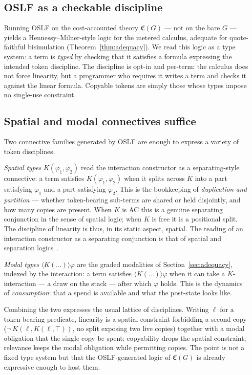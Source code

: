 \documentclass[11pt]{article}
\theoremstyle{definition}
\theoremstyle{plain}
\newcommand{\dia}[1]{\langle #1 \rangle}  %
\newcommand{\Cost}{\mathfrak{C}}              %
\begin{document}
\subsection{OSLF as a checkable discipline}

Running OSLF on the cost-accounted theory $\Cost(G)$ --- not on the bare
$G$ --- yields a Hennessy--Milner-style logic for the metered calculus,
adequate for quote-faithful bisimulation (Theorem~\ref{thm:adequacy}).
We read this logic as a type system: a term is \emph{typed} by checking
that it satisfies a formula expressing the intended token discipline. The
discipline is opt-in and per-term: the calculus does not force linearity,
but a programmer who requires it writes a term and checks it against the
linear formula. Copyable tokens are simply those whose types impose no
single-use constraint.

\subsection{Spatial and modal connectives suffice}

Two connective families generated by OSLF are enough to express a variety
of token disciplines.

\emph{Spatial types} $K(\varphi_1, \varphi_2)$ read the interaction
constructor as a separating-style connective: a term satisfies
$K(\varphi_1,\varphi_2)$ when it splits across $K$ into a part satisfying
$\varphi_1$ and a part satisfying $\varphi_2$. This is the bookkeeping of
\emph{duplication and partition} --- whether token-bearing sub-terms are
shared or held disjointly, and how many copies are present. When $K$ is
AC this is a genuine separating conjunction in the sense of spatial logic;
when $K$ is free it is a positional split. The discipline of linearity is
thus, in its static aspect, spatial. The reading of an interaction
constructor as a separating conjunction is that of spatial and separation
logics~\cite{CairesCardelli2003,OHearnReynolds2001,Reynolds2002}.

\emph{Modal types} $\dia{K(\dots)}\varphi$ are the graded modalities of
Section~\ref{sec:adequacy}, indexed by the interaction: a term satisfies
$\dia{K(\dots)}\varphi$ when it can take a $K$-interaction --- a draw on
the stack --- after which $\varphi$ holds. This is the dynamics of
\emph{consumption}: that a spend is available and what the post-state
looks like.

Combining the two expresses the usual lattice of disciplines. Writing
$\ell$ for a token-bearing predicate, linearity is a spatial constraint
forbidding a second copy ($\neg\, K(\ell, K(\ell, \top))$, no split
exposing two live copies) together with a modal obligation that the single
copy be spent; copyability drops the spatial constraint; relevance keeps
the modal obligation while permitting copies. The point is not a fixed
type system but that the OSLF-generated logic of $\Cost(G)$ is already
expressive enough to host them.
\end{document}
